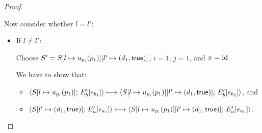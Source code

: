\begin{proof}
\begin{enumerate}
\begin{enumerate}
      Now consider whether $l = l'$:
      \begin{itemize}
        \item If $l \neq l'$:

          Choose $S' =
          S[l \mapsto u_{p_i}(p_1)][l' \mapsto (d_1, \textsf{true})]$,
          $i = 1$, $j = 1$, and $\pi = \mathrm{id}$.

          We have to show that:
          \begin{itemize}
          \item
            $\langle S[l \mapsto u_{p_i}(p_1)];\, E'_b\hspace{-0.5mm}\left[e_{b_1}\right] \rangle
            \longmapsto
            \langle S[l \mapsto u_{p_i}(p_1)][l' \mapsto (d_1, \textsf{true})];\, E'_b\hspace{-0.5mm}\left[e_{b_2}\right] \rangle$,
            and
          \item
            $\langle S[l' \mapsto (d_1, \textsf{true})];\, E'_a\hspace{-0.5mm}\left[e_{a_1}\right] \rangle
            \longmapsto
            \langle S[l \mapsto u_{p_i}(p_1)][l' \mapsto (d_1, \textsf{true})];\, E'_a\hspace{-0.5mm}\left[e_{a_2}\right] \rangle$.
          \end{itemize}


\end{itemize}
\end{enumerate}
\end{enumerate}
\end{proof}
